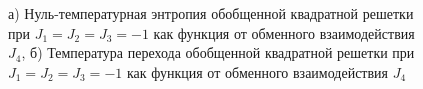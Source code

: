 \documentclass[utf8,12pt]{jetp}
\begin{document}
\begin{figure}[h]
	\begin{minipage}[h]{0.5\linewidth}
	\end{minipage}
	\hfill
	\begin{minipage}[h]{0.5\linewidth}
	\end{minipage}
	\caption{а) Нуль-температурная энтропия обобщенной квадратной решетки при $J_1 = J_2 = J_3 = -1$ как функция от обменного взаимодействия $J_4$, б) Температура перехода обобщенной квадратной решетки при $J_1 = J_2 = J_3 = -1$ как функция от обменного взаимодействия $J_4$}
	\label{Interaction}
\end{figure}
\end{document}
